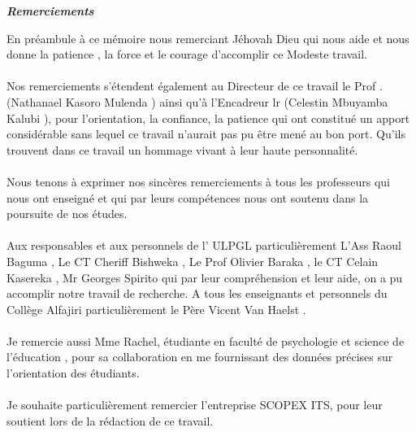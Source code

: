 \begin{center}
	{\Large \textit {\textbf{Remerciements }}}%
\end{center}
En préambule à ce mémoire nous remerciant Jéhovah Dieu  qui nous aide et nous donne la patience , la force et le courage d’accomplir ce Modeste travail.
\paragraph{}
Nos remerciements s’étendent également au Directeur de ce travail le Prof . (Nathanael Kasoro Mulenda ) ainsi qu'à l'Encadreur lr (Celestin Mbuyamba Kalubi ), pour l’orientation, la confiance, la patience qui ont constitué un apport considérable sans lequel ce travail n’aurait pas pu être mené au bon port. Qu’ils trouvent dans ce travail un hommage vivant à leur haute personnalité.\\
\paragraph{}
Nous tenons à exprimer nos sincères remerciements à tous les professeurs qui nous ont enseigné et qui par leurs compétences nous ont soutenu dans la poursuite de nos études.
\paragraph{}
Aux responsables et aux personnels de l' ULPGL  particulièrement  L'Ass Raoul Baguma , Le CT Cheriff Bishweka , Le Prof Olivier Baraka , le CT Celain Kasereka , Mr Georges Spirito  qui par leur compréhension et leur aide, on a pu accomplir notre travail de recherche.
A tous les enseignants et personnels du Collège Alfajiri particulièrement le Père Vicent Van Haelst  .
\paragraph{}
Je remercie aussi Mme Rachel, étudiante en faculté de psychologie et science de l'éducation  , pour sa collaboration en me fournissant des données précises sur l'orientation des étudiants.
\paragraph{}
Je souhaite particulièrement remercier l'entreprise SCOPEX ITS, pour leur soutient lors de la rédaction de ce travail. 
